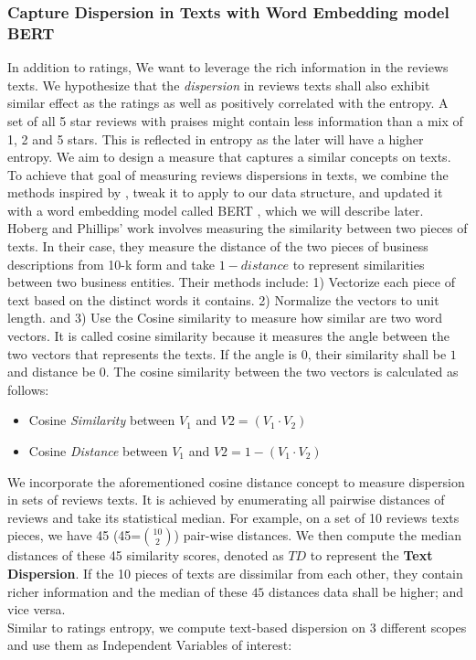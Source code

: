\documentclass[msom,blindrev]{informs3}
\begin{document}
\subsubsection{Capture Dispersion in Texts with Word Embedding model BERT}
In addition to ratings, We want to leverage the rich information in the reviews texts. We hypothesize that the \textit{dispersion} in reviews texts shall also exhibit similar effect as the ratings as well as positively correlated with the entropy. A set of all 5 star reviews with praises might contain less information than a mix of 1, 2 and 5 stars. This is reflected in entropy as the later will have a higher entropy. We aim to design a measure that captures a similar concepts on texts. To achieve that goal of measuring reviews dispersions in texts,  we combine the methods inspired by \cite{hoberg2016text}, tweak it to apply to our data structure,  and updated it with a word embedding model called BERT , which we will describe later. \\
Hoberg and Phillips' work involves measuring the similarity between two pieces of texts. In their case, they measure the distance of the two pieces of business descriptions from 10-k form and take $1 - distance$ to represent similarities between two business entities. Their methods include: 1) Vectorize each piece of text based on the distinct words it contains. 2) Normalize the vectors to unit length. and 3) Use the Cosine similarity to measure how similar are two word vectors. It is called cosine similarity because it measures the angle between the two vectors that represents the texts. If the angle is $0$, their similarity shall be $1$ and distance be $0$. The cosine similarity between the two vectors is calculated as follows: \\
\begin{itemize}
\item Cosine \textit{Similarity} between $V_{1}$ and $V{2} =(V_1 \cdot V_2)$
\item Cosine \textit{Distance} between $V_{1}$ and $V{2}=1-(V_1 \cdot V_2)$
\end{itemize}
We incorporate the aforementioned cosine distance concept to measure dispersion in sets of reviews texts. It is achieved by enumerating all pairwise distances of reviews and take its statistical median. For example, on a set of 10 reviews texts pieces, we have 45 (45=$\binom{10}{2}$) pair-wise distances.  We then compute the median distances of these 45 similarity scores, denoted as $TD$ to represent the \textbf{Text Dispersion}. If the 10 pieces of texts are dissimilar from each other, they contain richer information and the median of these $45$ distances data shall be higher; and vice versa.  \\
Similar to ratings entropy, we compute text-based dispersion on 3 different scopes and use them as Independent Variables of interest: \\
\end{document}
